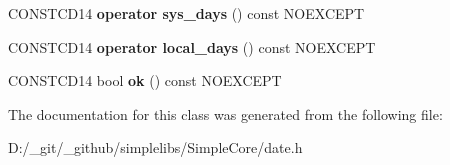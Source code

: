 \begin{DoxyCompactItemize}
C\+O\+N\+S\+T\+C\+D14 {\bfseries operator sys\+\_\+days} () const N\+O\+E\+X\+C\+E\+PT
\item 
\mbox{\label{classdate_1_1year__month__weekday_af7b6d017b5fc657da6b7741c3c7eedf0}} 
C\+O\+N\+S\+T\+C\+D14 {\bfseries operator local\+\_\+days} () const N\+O\+E\+X\+C\+E\+PT
\item 
\mbox{\label{classdate_1_1year__month__weekday_a9298bd47d32e511e6bdbcdce5af44d9a}} 
C\+O\+N\+S\+T\+C\+D14 bool {\bfseries ok} () const N\+O\+E\+X\+C\+E\+PT
\end{DoxyCompactItemize}


The documentation for this class was generated from the following file\+:\begin{DoxyCompactItemize}
\item 
D\+:/\+\_\+git/\+\_\+github/simplelibs/\+Simple\+Core/date.\+h\end{DoxyCompactItemize}
